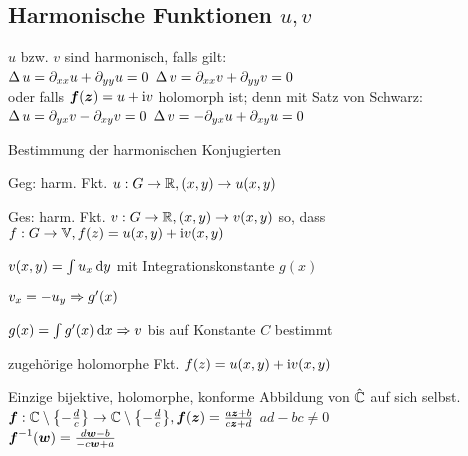 \documentclass[german,color,5pt]{latex4ei/latex4ei_fs}
\begin{document}
\begin{sectionbox}
	\subsection{Harmonische Funktionen $u,v$}
	$u$ bzw. $v$ sind harmonisch, falls gilt:\\
	$\operatorname{\Delta} u = \partial_{xx} u + \partial_{yy} u = 0$ \qquad\quad $\operatorname{\Delta} v = \partial_{xx} v + \partial_{yy} v = 0$\\[0.5em]
	oder falls $\boldsymbol{f}(\boldsymbol{z}) = u + \mathrm{i} v$ holomorph ist; denn mit Satz von Schwarz:\\
	$\operatorname{\Delta} u = \partial_{yx} v - \partial_{xy} v = 0$ \qquad\quad $\operatorname{\Delta} v = - \partial_{yx} u + \partial_{xy} u = 0$
	\begin{cookbox}{Bestimmung der harmonischen Konjugierten}
			\item Geg: harm. Fkt. $u: G \rightarrow \mathbb R, (x,y) \rightarrow u(x,y)$
			\item Ges: harm. Fkt. $v: G \rightarrow \mathbb R, (x,y) \rightarrow v(x,y)$
			so, dass $f: G \rightarrow \mathbb V, f(z) = u(x,y) + \mathrm{i} v (x,y)$
			\item $v(x,y) = \int u_x \diff y$ mit Integrationskonstante $g(x)$
			\item $v_x = -u_y \Rightarrow g'(x)$
			\item $g(x) = \int g'(x) \diff x \Ra v$ bis auf Konstante $C$ bestimmt
			\item zugehörige holomorphe Fkt.
			$f (z) = u (x,y) + \mathrm{i} v(x,y)$
	\end{cookbox}
\end{sectionbox}

\begin{sectionbox}
	Einzige bijektive, holomorphe, konforme Abbildung von $\hat {\mathbb C}$ auf sich selbst.\\
	$\boldsymbol{f}:\mathbb C \setminus \bigl\{-\frac{d}{c}\bigr\} \rightarrow \mathbb C \setminus \bigl\{-\frac{d}{c}\bigr\}, \boldsymbol{f}(\boldsymbol{z}) = \frac{a\boldsymbol{z} + b}{c\boldsymbol{z} + d}$ \qquad $ad - bc \ne 0$\\ 
	$\boldsymbol{f}^{-1}(\boldsymbol{w}) = \frac{d\boldsymbol{w} - b}{-c \boldsymbol{w} + a}$
\end{sectionbox}
\end{document}
